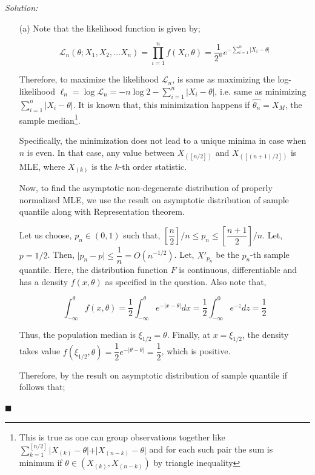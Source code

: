 \documentclass[12pt]{article}
\theoremstyle{definition}
\newenvironment{answer}{\textit{Solution: }\quad }{ \hfill $\blacksquare$}
\numberwithin{equation}{section}
\begin{document}
\begin{answer}
    \begin{enumerate}
        \item[(a)] Note that the likelihood function is given by;
        
        $$\mathcal{L}_n(\theta; X_1, X_2, \dots X_n) = \prod_{i=1}^{n} f(X_i, \theta) = \dfrac{1}{2^n} e^{-\sum_{i=1}^{n} \vert X_i - \theta \vert }$$

        Therefore, to maximize the likelihood $\mathcal{L}_n$, is same as maximizing the log-likelihood $\ell_n = \log\mathcal{L}_n = -n \log 2 - \sum_{i=1}^{n} \vert X_i - \theta \vert$, i.e. same as minimizing $\sum_{i=1}^{n} \vert X_i - \theta \vert$. It is known that, this minimization happens if $\widehat{\theta_n} = X_M$, the sample median\footnote{This is true as one can group observations together like $\sum_{k=1}^{[n/2]} \vert X_{(k)} - \theta \vert + \vert X_{(n-k)} - \theta \vert$ and for each such pair the sum is minimum if $\theta \in (X_{(k)}, X_{(n-k)})$ by triangle inequality}.

        Specifically, the minimization does not lead to a unique minima in case when $n$ is even. In that case, any value between $X_{(\left[ n/2\right])}$ and $X_{(\left[ (n+1)/2\right])}$ is MLE, where $X_{(k)}$ is the $k$-th order statistic.

        Now, to find the asymptotic non-degenerate distribution of properly normalized MLE, we use the result on asymptotic distribution of sample quantile along with Representation theorem.

        Let us choose, $p_n \in (0, 1)$ such that, $\left[ \dfrac{n}{2} \right]/n \leq p_n \leq \left[ \dfrac{n+1}{2} \right]/n$. Let, $p = 1/2$. Then, $\vert p_n - p\vert \leq \dfrac{1}{n} = O(n^{-1/2})$. Let, $X'_{p_n}$ be the $p_n$-th sample quantile. Here, the distribution function $F$ is continuous, differentiable and has a density $f(x, \theta)$ as specified in the question. Also note that, 

        $$
        \int_{-\infty}^{\theta}f(x, \theta) = \dfrac{1}{2} \int_{-\infty}^{\theta} e^{-\vert x - \theta \vert} dx = \dfrac{1}{2} \int_{-\infty}^{0} e^{-z}dz = \dfrac{1}{2}
        $$

        Thus, the population median is $\xi_{1/2} = \theta$. Finally, at $x = \xi_{1/2}$, the density takes value $f(\xi_{1/2}, \theta) = \dfrac{1}{2}e^{-\vert \theta - \theta \vert} = \dfrac{1}{2}$, which is positive. 

        Therefore, by the result on asymptotic distribution of sample quantile if follows that;


\end{enumerate}
\end{answer}
\end{document}

